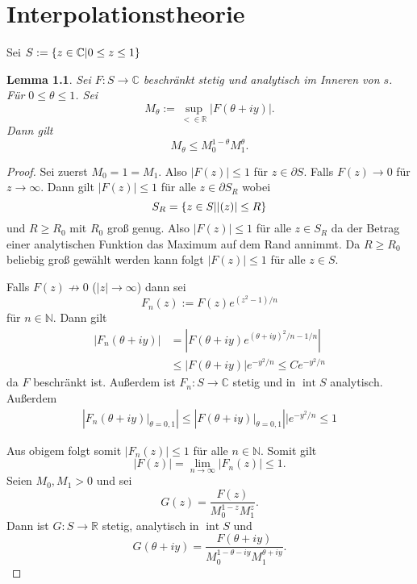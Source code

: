 \documentclass[
paper=a4,
bibtotocnumbered,
liststotocnumbered,
tablecaptionabove,
pointlessnumbers,
twoside,
openright,
10pt
]
{report}
\let\Re\relax\let\Im\relax
\DeclareMathOperator{\Re}{Re}
\DeclareMathOperator{\Im}{Im}
\newtheorem{lem}[thm]{Lemma}
\theoremstyle{definition}
\numberwithin{equation}{chapter}
\begin{document}
\chapter{Interpolationstheorie}
Sei $S:=\{z\in \mathbb C|0\le \Re z \le 1\}$
\begin{lem}\label{4.1}
Sei $F:S\to \mathbb C$ beschränkt stetig und analytisch im Inneren von $s$. Für $0\le \theta\le 1$. Sei 
\begin{equation}
M_\theta:= \sup_{<\in \mathbb R} |F(\theta+iy)|.
\end{equation}
Dann gilt
\begin{equation}
M_\theta \le M_0^{1-\theta} M_1^\theta.
\end{equation}
\end{lem}

\begin{proof}
Sei zuerst $M_0=1=M_1$. Also $|F(z)|\le 1$ für $z\in \partial S$. Falls $F(z)\to 0$ für $z\to \infty$. Dann gilt $|F(z)|\le 1$ für alle $z\in \partial S_R$ wobei
\begin{equation}
S_R = \{z\in S| |\Im(z)|\le R\}
\end{equation} 
und $R\ge R_0$ mit $R_0$ groß genug. Also $|F(z)|\le 1$ für alle $z\in S_R$ da der Betrag einer analytischen Funktion das Maximum auf dem Rand annimmt. Da $R\ge R_0$ beliebig groß gewählt werden kann folgt $|F(z)|\le 1$ für alle $z\in S$.

Falls $F(z)\not \to 0$ ($|z|\to \infty$) dann sei
\begin{equation}
F_n(z):= F(z) e^{(z^2-1)/n}
\end{equation}
für $n\in \mathbb N$. Dann gilt
\begin{align}
|F_n(\theta + i y)| &= \left | F(\theta + i y) e^{(\theta+iy)^2/n -1/n} \right |\\
&\le | F(\theta + iy) | e^{-y^2/n} \le C e^{-y^2/n}
\end{align}
da $F$ beschränkt ist.  Außerdem ist $F_n: S\to \mathbb C$ stetig und in $\operatorname{int} S$ analytisch. Außerdem
\begin{align}
\left|F_n(\theta + iy)\big| _{\theta=0,1}\right| \le | F(\theta +iy)\big |_{\theta=0,1} || e^{-y^2/n} \le 1
\end{align}

Aus obigem folgt somit $|F_n(z)|\le 1$ für alle $n\in \mathbb N$. Somit gilt
\begin{equation}
|F(z)|=\lim_{n\to \infty} |F_n(z)|\le 1.
\end{equation}
Seien $M_0, M_1>0$ und sei
\begin{equation}
G(z) = \frac{F(z)}{M_0^{1-z} M_1^z}.
\end{equation}
Dann ist $G: S\to \mathbb R$ stetig, analytisch in $\operatorname{int} S$ und
\begin{equation}
G(\theta +iy) = \frac{F(\theta +iy)}{M_0^{1-\theta-iy} M_1^{\theta+iy}}.
\end{equation} 


\end{proof}
\end{document}
